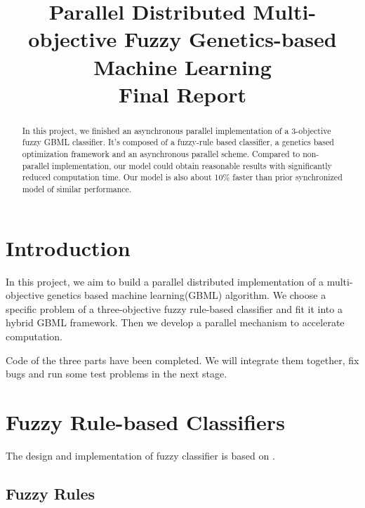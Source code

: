 \documentclass[conference]{IEEEtran}
\begin{document}
  
  \title{Parallel Distributed Multi-objective Fuzzy Genetics-based Machine Learning \\ Final Report}
  
  \author{
  }
  
  \maketitle
  
  \begin{abstract}
  In this project, we finished an asynchronous parallel implementation of a 3-objective fuzzy GBML classifier. It's composed of a fuzzy-rule based classifier, a genetics based optimization framework and an asynchronous parallel scheme. Compared to non-parallel implementation, our model could obtain reasonable results with significantly reduced computation time. Our model is also about 10\% faster than prior synchronized model of similar performance.
  \end{abstract}
  \IEEEpeerreviewmaketitle
  
  \section{Introduction}
  In this project, we aim to build a parallel distributed implementation of a multi-objective genetics based machine learning(GBML) algorithm. We choose a specific problem of a three-objective fuzzy rule-based classifier and fit it into a hybrid GBML framework. Then we develop a parallel mechanism to accelerate computation.

  Code of the three parts have been completed. We will integrate them together, fix bugs and run some test problems in the next stage.

  \section{Fuzzy Rule-based Classifiers}
  The design and implementation of fuzzy classifier is based on \cite{ishibuchi2007analysis}.
  \subsection{Fuzzy Rules}
\end{document}
